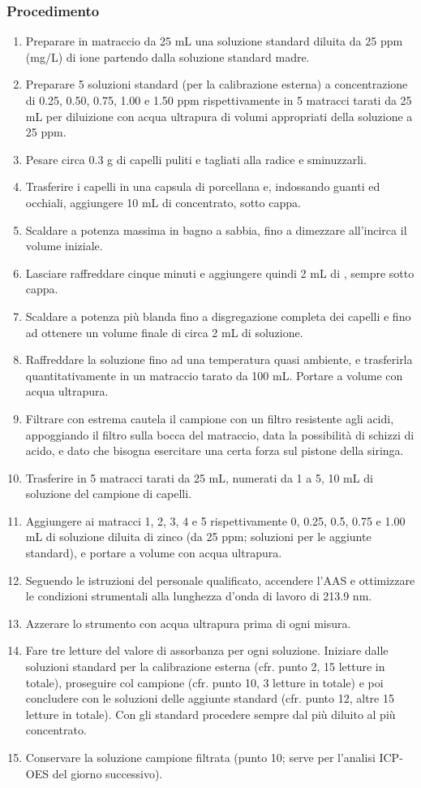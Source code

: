 \subsubsection{Procedimento}
\begin{enumerate}
\item Preparare in matraccio da 25 mL una soluzione standard diluita da 25 ppm (mg/L) di ione  partendo dalla soluzione standard madre.
\item Preparare 5 soluzioni standard (per la calibrazione esterna) a concentrazione di 0.25, 0.50, 0.75, 1.00 e 1.50 ppm rispettivamente in 5 matracci tarati da 25 mL per diluizione con acqua ultrapura di volumi appropriati della soluzione a 25 ppm.
\item Pesare circa 0.3 g di capelli puliti e tagliati alla radice e sminuzzarli.
\item Trasferire i capelli in una capsula di porcellana e, indossando guanti ed occhiali, aggiungere 10 mL di  concentrato, sotto cappa.
\item Scaldare a potenza massima in bagno a sabbia, fino a dimezzare all'incirca il volume iniziale.
\item Lasciare raffreddare cinque minuti e aggiungere quindi 2 mL di , sempre sotto cappa.
\item Scaldare a potenza più blanda fino a disgregazione completa dei capelli e fino ad ottenere un volume finale di circa 2 mL di soluzione.
\item Raffreddare la soluzione fino ad una temperatura quasi ambiente, e trasferirla quantitativamente in un matraccio tarato da 100 mL. Portare a volume con acqua ultrapura.
\item Filtrare con estrema cautela il campione con un filtro resistente agli acidi, appoggiando il filtro sulla bocca del matraccio, data la possibilità di schizzi di acido, e dato che bisogna esercitare una certa forza sul pistone della siringa.
\item Trasferire in 5 matracci tarati da 25 mL, numerati da 1 a 5, 10 mL di soluzione del campione di capelli.
\item Aggiungere ai matracci 1, 2, 3, 4 e 5 rispettivamente 0, 0.25, 0.5, 0.75 e 1.00 mL di soluzione diluita di zinco (da 25 ppm; soluzioni per le aggiunte standard), e portare a volume con acqua ultrapura.
\item Seguendo le istruzioni del personale qualificato, accendere l'AAS e ottimizzare le condizioni strumentali alla lunghezza d'onda di lavoro di 213.9 nm.
\item Azzerare lo strumento con acqua ultrapura prima di ogni misura.
\item Fare tre letture del valore di assorbanza per ogni soluzione. Iniziare dalle soluzioni standard per la calibrazione esterna (cfr. punto 2, 15 letture in totale), proseguire col campione (cfr. punto 10, 3 letture in totale) e poi concludere con le soluzioni delle aggiunte standard (cfr. punto 12, altre 15 letture in totale). Con gli standard procedere sempre dal più diluito al più concentrato.
\item Conservare la soluzione campione filtrata (punto 10; serve per l'analisi ICP-OES del giorno successivo).
\end{enumerate}

